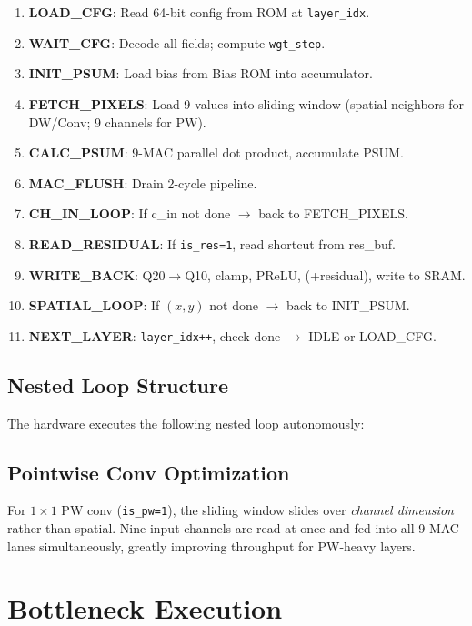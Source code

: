 \begin{enumerate}[nosep]
  \item \textbf{LOAD\_CFG}: Read 64-bit config from ROM at \texttt{layer\_idx}.
  \item \textbf{WAIT\_CFG}: Decode all fields; compute \texttt{wgt\_step}.
  \item \textbf{INIT\_PSUM}: Load bias from Bias ROM into accumulator.
  \item \textbf{FETCH\_PIXELS}: Load 9 values into sliding window (spatial neighbors for DW/Conv; 9 channels for PW).
  \item \textbf{CALC\_PSUM}: 9-MAC parallel dot product, accumulate PSUM.
  \item \textbf{MAC\_FLUSH}: Drain 2-cycle pipeline.
  \item \textbf{CH\_IN\_LOOP}: If c\_in not done $\rightarrow$ back to FETCH\_PIXELS.
  \item \textbf{READ\_RESIDUAL}: If \texttt{is\_res=1}, read shortcut from res\_buf.
  \item \textbf{WRITE\_BACK}: Q20$\to$Q10, clamp, PReLU, (+residual), write to SRAM.
  \item \textbf{SPATIAL\_LOOP}: If $(x,y)$ not done $\rightarrow$ back to INIT\_PSUM.
  \item \textbf{NEXT\_LAYER}: \texttt{layer\_idx++}, check done $\rightarrow$ IDLE or LOAD\_CFG.
\end{enumerate}
 
\subsection{Nested Loop Structure}
 
The hardware executes the following nested loop autonomously:
 
\subsection{Pointwise Conv Optimization}
 
For $1\times1$ PW conv (\texttt{is\_pw=1}), the sliding window slides over \emph{channel dimension} rather than spatial. Nine input channels are read at once and fed into all 9 MAC lanes simultaneously, greatly improving throughput for PW-heavy layers.
 
\section{Bottleneck Execution}
 
